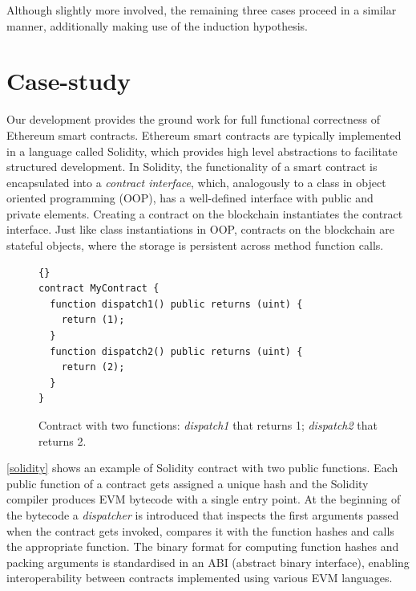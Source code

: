 \documentclass[sigplan,10pt,review]{acmart}\settopmatter{printfolios=true,printccs=false,printacmref=false}
\begin{document}
Although slightly more involved, the remaining three cases proceed in a similar manner,
additionally making use of the induction hypothesis.
%
\section{Case-study}
\label{sec:case}



Our development provides the ground work for full functional correctness
of Ethereum smart contracts.
Ethereum smart contracts are typically implemented in a language called Solidity,
which provides high level abstractions to facilitate 
structured development.
In Solidity, the functionality of a smart contract is encapsulated into a
\textit{contract interface}, which, analogously to a class in object oriented programming
(OOP), has a well-defined interface with public and private elements.
Creating a contract on the blockchain instantiates the contract interface.
Just like class instantiations in OOP, contracts on the blockchain are
stateful objects, where the storage is persistent across method function calls.

\begin{figure}[h!]
\begin{lstlisting}[language=Solidity]{}
contract MyContract {
  function dispatch1() public returns (uint) {
  	return (1);
  }
  function dispatch2() public returns (uint) {
  	return (2);
  }
}
\end{lstlisting}
\caption{Contract with two functions: \textit{dispatch1} that returns 1; \textit{dispatch2} that returns 2.}
\label{solidity}
\end{figure}

\autoref{solidity} shows an example of Solidity contract with two public functions.
Each public function of a contract gets assigned a unique hash and
the Solidity compiler produces EVM bytecode with a single entry point.
At the beginning of the bytecode a \textit{dispatcher} is introduced that inspects the first arguments
passed when the contract gets invoked, compares it with the function hashes and
calls the appropriate function.
The binary format for computing function hashes and packing arguments is standardised
in an ABI (abstract binary interface), enabling interoperability between
contracts implemented using various EVM languages.
\end{document}
